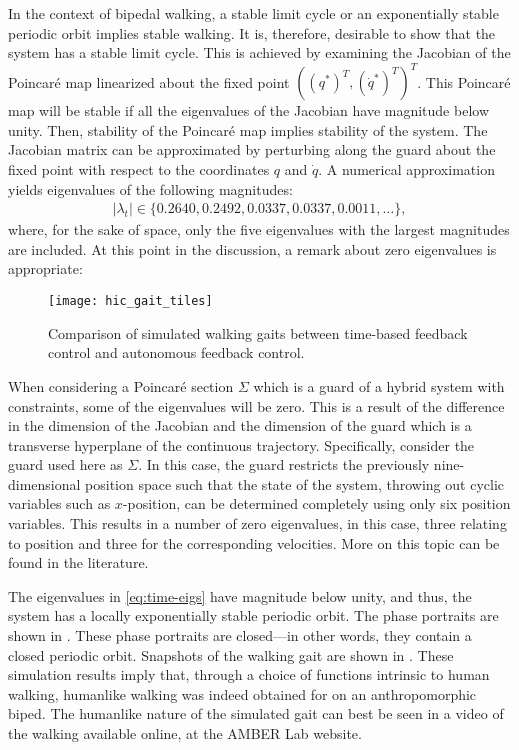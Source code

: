 In the context of bipedal walking, a stable limit cycle or an exponentially stable periodic orbit implies stable walking. It is, therefore, desirable to show that the system has a stable limit cycle. This is achieved by examining the Jacobian of the Poincar{\'e} map linearized about the fixed point $((q^*)^T, ({\dot q}^*)^T)^T$.\cite{PC89}\xspace This Poincar{\'e} map will be stable if all the eigenvalues of the Jacobian have magnitude below unity. Then, stability of the Poincar{\'e} map implies stability of the system. The Jacobian matrix can be approximated by perturbing along the guard about the fixed point with respect to the coordinates $q$ and ${\dot q}$. A numerical approximation yields eigenvalues of the following magnitudes:
\begin{align}
  \label{eq:time-eigs}
  |\lambda_t| \in \{0.2640, 0.2492, 0.0337, 0.0337, 0.0011, \ldots\},
\end{align}
where, for the sake of space, only the five eigenvalues with the largest magnitudes are included. At this point in the discussion, a remark about zero eigenvalues is appropriate:


\begin{figure*}[p!]
  \centering
  \texttt{[image: hic\_gait\_tiles]}
  \caption{Comparison of simulated walking gaits between time-based feedback control and autonomous feedback control.}
  \label{fig:gaittiles}
\end{figure*}

\begin{remark}
  When considering a Poincar{\'e} section $\Sigma$ which is a guard of a hybrid system with constraints, some of the eigenvalues will be zero. This is a result of the difference in the dimension of the Jacobian and the dimension of the guard which is a transverse hyperplane of the continuous trajectory. Specifically, consider the guard used here as $\Sigma$. In this case, the guard restricts the previously nine-dimensional position space such that the state of the system, throwing out cyclic variables such as $x$-position, can be determined completely using only six position variables. This results in a number of zero eigenvalues, in this case, three relating to position and three for the corresponding velocities. More on this topic can be found in the literature.\cite{WA10}
\end{remark}

The eigenvalues in \eqref{eq:time-eigs} have magnitude below unity, and thus, the system has a locally exponentially stable periodic orbit. The phase portraits are shown in . These phase portraits are closed---in other words, they contain a closed periodic orbit. Snapshots of the walking gait are shown in . These simulation results imply that, through a choice of functions intrinsic to human walking, humanlike walking was indeed obtained for on an anthropomorphic biped. The humanlike nature of the simulated gait can best be seen in a video of the walking available online, at the AMBER Lab website.\cite{url:bipedalrobotics}

